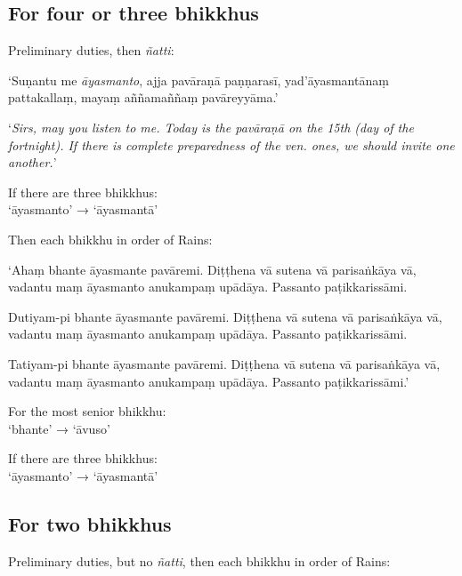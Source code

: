 \subsection{For four or three bhikkhus}

Preliminary duties, then \emph{ñatti}:

\vspace*{\parskip}

\begin{paritta}
‘Suṇantu me \emph{āyasmanto}, ajja pavāraṇā paṇṇarasī, yad'āyasmantānaṃ
pattakallaṃ, mayaṃ aññamaññaṃ pavāreyyāma.’
\end{paritta}

‘\emph{Sirs, may you listen to me. Today is the pavāraṇā on the 15th (day of the
fortnight). If there is complete preparedness of the ven. ones, we should
invite one another.}’


If there are three bhikkhus:\\
‘āyasmanto’ → ‘āyasmantā’

Then each bhikkhu in order of Rains:

\vspace*{\parskip}

\begin{paritta}
‘Ahaṃ bhante āyasmante pavāremi. Diṭṭhena vā sutena vā parisaṅkāya vā, vadantu
maṃ āyasmanto anukampaṃ upādāya. Passanto paṭikkarissāmi.

Dutiyam-pi bhante āyasmante pavāremi. Diṭṭhena vā sutena vā parisaṅkāya vā,
vadantu maṃ āyasmanto anukampaṃ upādāya. Passanto paṭikkarissāmi.

Tatiyam-pi bhante āyasmante pavāremi. Diṭṭhena vā sutena vā parisaṅkāya vā,
vadantu maṃ āyasmanto anukampaṃ upādāya. Passanto paṭikkarissāmi.’
\end{paritta}

For the most senior bhikkhu:\\
‘bhante’ → ‘āvuso’

If there are three bhikkhus:\\
‘āyasmanto’ → ‘āyasmantā’

\subsection{For two bhikkhus}

Preliminary duties, but no \emph{ñatti}, then each bhikkhu in order of Rains:

\vspace*{\parskip}

